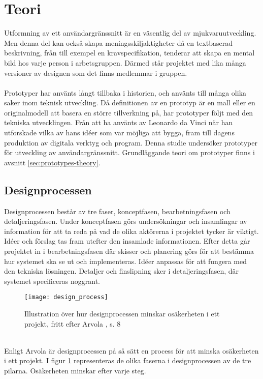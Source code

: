 \section{Teori}
\label{cha:rebecca-theory}
Utformning av ett användargränssnitt är en väsentlig del av mjukvaruutveckling. Men denna del kan också skapa meningsskiljaktigheter då en textbaserad beskrivning, från till exempel en kravspecifikation, tenderar att skapa en mental bild hos varje person i arbetsgruppen. Därmed står projektet med lika många versioner av designen som det finns medlemmar i gruppen. \cite{prototyping-guide} %
\\ \\
Prototyper har använts långt tillbaka i historien, och använts till många olika saker inom teknisk utveckling. Då definitionen av en prototyp är en mall eller en originalmodell att basera en större tillverkning på, har prototyper följt med den tekniska utvecklingen. Från att ha använts av Leonardo da Vinci när han utforskade vilka av hans idéer som var möjliga att bygga, fram till dagens produktion av digitala verktyg och program. \cite{effective-prototyping} %
Denna studie undersöker prototyper för utveckling av användargränssnitt. Grundläggande teori om prototyper finns i avsnitt \ref{sec:prototypes-theory}.

\subsection{Designprocessen}
Designprocessen består av tre faser, konceptfasen, bearbetningsfasen och detaljeringsfasen. %
Under konceptfasen görs undersökningar och insamlingar av information för att ta reda på vad de olika aktörerna i projektet tycker är viktigt. Idéer och förslag tas fram utefter den insamlade informationen. %
Efter detta går projektet in i bearbetningsfasen där skisser och planering görs för att bestämma hur systemet ska se ut och implementeras. Idéer anpassas för att fungera med den tekniska lösningen. %
Detaljer och finslipning sker i detaljeringsfasen, där systemet specificeras noggrant. %
\cite{arvolaboken} %
\\
\begin{figure}[!htb]
  \centering
  \texttt{[image: design\_process]}
  \caption[Illustration över hur designprocessen minskar osäkerheten i ett projekt.]{Illustration över hur designprocessen minskar osäkerheten i ett projekt, fritt efter Arvola \protect\cite{arvolaboken}, s. 8}
  \label{fig:design_process}
\end{figure}
\ \\
Enligt Arvola \cite{arvolaboken} är designprocessen på så sätt en process för att minska osäkerheten i ett projekt. I figur \ref{fig:design_process} representeras de olika faserna i designprocessen av de tre pilarna. Osäkerheten minskar efter varje steg.  %

